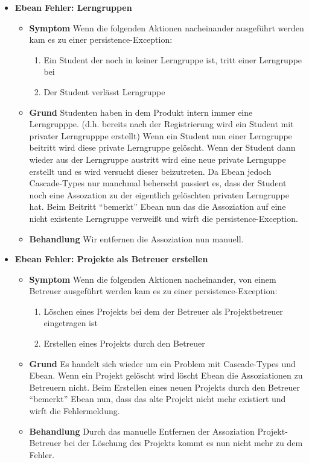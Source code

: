 \documentclass[parskip=full]{scrartcl}
\newcommand{\fehler}[4]{\textbf{#1}
 							\begin{itemize}
 							  \item \textbf{Symptom}  #2
 							  \item \textbf{Grund} #3
 							  \item \textbf{Behandlung} #4
 							\end{itemize}}
\begin{document}
\begin{itemize}
\item \fehler{Ebean Fehler: Lerngruppen}{Wenn die folgenden Aktionen
nacheinander ausgeführt werden kam es zu einer
persistence-Exception:\begin{enumerate}
  \item Ein Student der noch in keiner Lerngruppe ist, tritt einer Lerngruppe
  bei
  \item Der Student verlässt Lerngruppe
\end{enumerate}}
{Studenten haben in dem Produkt intern immer eine Lerngrupppe.
(d.h.
bereits nach der Registrierung wird ein Student mit privater Lerngrupppe
erstellt) Wenn ein Student nun einer Lerngruppe beitritt wird diese private
Lerngruppe gelöscht. Wenn der Student dann wieder aus der Lerngruppe austritt
wird eine neue private Lernguppe erstellt und es wird versucht dieser beizutreten. Da Ebean
jedoch Cascade-Types nur manchmal beherscht passiert es, dass der Student noch
eine Assozation zu der eigentlich gelöschten privaten Lerngruppe hat. Beim
Beitritt \enquote{bemerkt} Ebean nun das die Assoziation auf eine nicht
existente Lerngruppe verweißt und wirft die persistence-Exception.}{Wir
entfernen die Assoziation nun manuell.}
\item \fehler{Ebean Fehler: Projekte als Betreuer erstellen}{Wenn die folgenden
Aktionen nacheinander, von einem Betreuer ausgeführt werden kam es zu einer
persistence-Exception:
\begin{enumerate}
  \item Löschen eines Projekts bei dem der Betreuer als Projektbetreuer
  eingetragen ist
  \item Erstellen eines Projekts durch den Betreuer
\end{enumerate}}{Es handelt sich wieder um ein Problem mit Cascade-Types und
Ebean. Wenn ein Projekt gelöscht wird löscht Ebean die Assoziationen zu
Betreuern nicht. Beim Erstellen eines neuen Projekts durch den Betreuer
\enquote{bemerkt} Ebean nun, dass das alte Projekt nicht mehr existiert und
wirft die Fehlermeldung. 
}{Durch das manuelle Entfernen der Assoziation Projekt-Betreuer
bei der Löschung des Projekts kommt es nun nicht mehr zu dem Fehler. }
\end{itemize}
\end{document}
